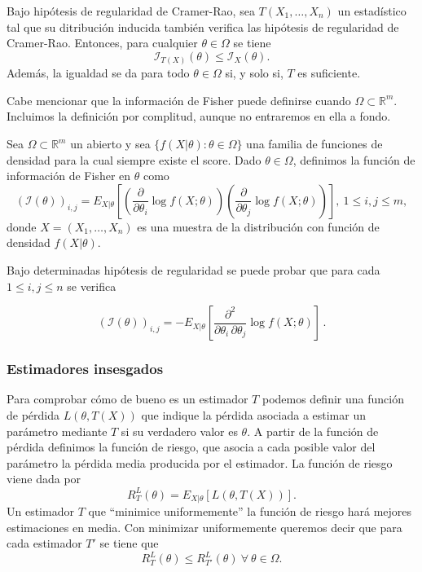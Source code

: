 \documentclass{article}
\begin{document}
    \begin{lem}
        Bajo hipótesis de regularidad de Cramer-Rao, sea $T(X_1, \ldots, X_n)$ un estadístico tal que su ditribución inducida también verifica las hipótesis de regularidad de Cramer-Rao. Entonces, para cualquier $\theta \in \Omega$ se tiene
        \[\mathcal{I}_{T(X)}(\theta) \le \mathcal{I}_{X}(\theta).\]
        Además, la igualdad se da para todo $\theta \in \Omega$ si, y solo si, $T$ es suficiente.
    \end{lem}

    Cabe mencionar que la información de Fisher puede definirse cuando $\Omega \subset \mathbb{R}^m$. Incluimos la definición por complitud, aunque no entraremos en ella a fondo.

    \begin{definition}
        Sea $\Omega \subset \mathbb{R}^m$ un abierto y sea $\{f(X|\theta): \theta \in \Omega\}$ una familia de funciones de densidad para la cual siempre existe el score. Dado $\theta \in \Omega$, definimos la función de información de Fisher en $\theta$ como
        \[{\left(\mathcal{I} \left(\theta \right) \right)}_{i, j} = E_{X|\theta} \left[
          \left(\frac{\partial}{\partial\theta_i} \log f(X;\theta)\right)
          \left(\frac{\partial}{\partial\theta_j} \log f(X;\theta)\right)\right], \ 1 \le i,j \le m,\]
        donde $X = (X_1, \ldots, X_n)$ es una muestra de la distribución con función de densidad $f(X|\theta)$.
    \end{definition}

    Bajo determinadas hipótesis de regularidad se puede probar que para cada $1 \le i, j \le n$ se verifica

    \[{\left(\mathcal{I} \left(\theta \right) \right)}_{i, j} =
      -E_{X|\theta}\left[\frac{\partial^2}{\partial\theta_i \, \partial\theta_j} \log f(X;\theta)
    \right]\,.\]

    \subsubsection{Estimadores insesgados}

    Para comprobar cómo de bueno es un estimador $T$ podemos definir una función de pérdida $L(\theta,T(X))$ que indique la pérdida asociada a estimar un parámetro mediante $T$ si su verdadero valor es $\theta$. A partir de la función de pérdida definimos la función de riesgo, que asocia a cada posible valor del parámetro la pérdida media producida por el estimador. La función de riesgo viene dada por
    \[ R^L_T(\theta) = E_{X|\theta} [L(\theta,T(X))].\]
    Un estimador $T$ que ``minimice uniformemente'' la función de riesgo hará mejores estimaciones en media. Con minimizar uniformemente queremos decir que para cada estimador $T'$ se tiene que
    \[ R^L_T(\theta) \leq R^L_{T'}(\theta) \ \forall \ \theta \in \Omega.\]
\end{document}
